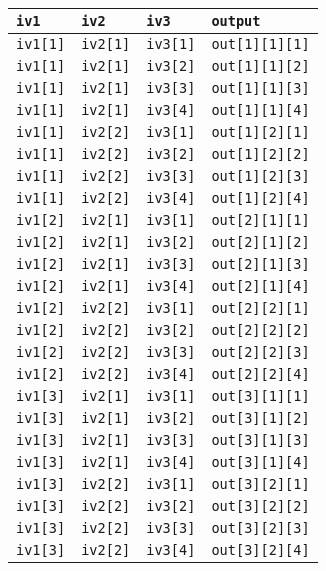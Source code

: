 \begin{longtable}[]{@{}llll@{}}
\toprule
\texttt{iv1} & \texttt{iv2} & \texttt{iv3} &
\texttt{output}\tabularnewline
\midrule
\endhead
\texttt{iv1{[}1{]}} & \texttt{iv2{[}1{]}} & \texttt{iv3{[}1{]}} &
\texttt{out{[}1{]}{[}1{]}{[}1{]}}\tabularnewline
\texttt{iv1{[}1{]}} & \texttt{iv2{[}1{]}} & \texttt{iv3{[}2{]}} &
\texttt{out{[}1{]}{[}1{]}{[}2{]}}\tabularnewline
\texttt{iv1{[}1{]}} & \texttt{iv2{[}1{]}} & \texttt{iv3{[}3{]}} &
\texttt{out{[}1{]}{[}1{]}{[}3{]}}\tabularnewline
\texttt{iv1{[}1{]}} & \texttt{iv2{[}1{]}} & \texttt{iv3{[}4{]}} &
\texttt{out{[}1{]}{[}1{]}{[}4{]}}\tabularnewline
\texttt{iv1{[}1{]}} & \texttt{iv2{[}2{]}} & \texttt{iv3{[}1{]}} &
\texttt{out{[}1{]}{[}2{]}{[}1{]}}\tabularnewline
\texttt{iv1{[}1{]}} & \texttt{iv2{[}2{]}} & \texttt{iv3{[}2{]}} &
\texttt{out{[}1{]}{[}2{]}{[}2{]}}\tabularnewline
\texttt{iv1{[}1{]}} & \texttt{iv2{[}2{]}} & \texttt{iv3{[}3{]}} &
\texttt{out{[}1{]}{[}2{]}{[}3{]}}\tabularnewline
\texttt{iv1{[}1{]}} & \texttt{iv2{[}2{]}} & \texttt{iv3{[}4{]}} &
\texttt{out{[}1{]}{[}2{]}{[}4{]}}\tabularnewline
\texttt{iv1{[}2{]}} & \texttt{iv2{[}1{]}} & \texttt{iv3{[}1{]}} &
\texttt{out{[}2{]}{[}1{]}{[}1{]}}\tabularnewline
\texttt{iv1{[}2{]}} & \texttt{iv2{[}1{]}} & \texttt{iv3{[}2{]}} &
\texttt{out{[}2{]}{[}1{]}{[}2{]}}\tabularnewline
\texttt{iv1{[}2{]}} & \texttt{iv2{[}1{]}} & \texttt{iv3{[}3{]}} &
\texttt{out{[}2{]}{[}1{]}{[}3{]}}\tabularnewline
\texttt{iv1{[}2{]}} & \texttt{iv2{[}1{]}} & \texttt{iv3{[}4{]}} &
\texttt{out{[}2{]}{[}1{]}{[}4{]}}\tabularnewline
\texttt{iv1{[}2{]}} & \texttt{iv2{[}2{]}} & \texttt{iv3{[}1{]}} &
\texttt{out{[}2{]}{[}2{]}{[}1{]}}\tabularnewline
\texttt{iv1{[}2{]}} & \texttt{iv2{[}2{]}} & \texttt{iv3{[}2{]}} &
\texttt{out{[}2{]}{[}2{]}{[}2{]}}\tabularnewline
\texttt{iv1{[}2{]}} & \texttt{iv2{[}2{]}} & \texttt{iv3{[}3{]}} &
\texttt{out{[}2{]}{[}2{]}{[}3{]}}\tabularnewline
\texttt{iv1{[}2{]}} & \texttt{iv2{[}2{]}} & \texttt{iv3{[}4{]}} &
\texttt{out{[}2{]}{[}2{]}{[}4{]}}\tabularnewline
\texttt{iv1{[}3{]}} & \texttt{iv2{[}1{]}} & \texttt{iv3{[}1{]}} &
\texttt{out{[}3{]}{[}1{]}{[}1{]}}\tabularnewline
\texttt{iv1{[}3{]}} & \texttt{iv2{[}1{]}} & \texttt{iv3{[}2{]}} &
\texttt{out{[}3{]}{[}1{]}{[}2{]}}\tabularnewline
\texttt{iv1{[}3{]}} & \texttt{iv2{[}1{]}} & \texttt{iv3{[}3{]}} &
\texttt{out{[}3{]}{[}1{]}{[}3{]}}\tabularnewline
\texttt{iv1{[}3{]}} & \texttt{iv2{[}1{]}} & \texttt{iv3{[}4{]}} &
\texttt{out{[}3{]}{[}1{]}{[}4{]}}\tabularnewline
\texttt{iv1{[}3{]}} & \texttt{iv2{[}2{]}} & \texttt{iv3{[}1{]}} &
\texttt{out{[}3{]}{[}2{]}{[}1{]}}\tabularnewline
\texttt{iv1{[}3{]}} & \texttt{iv2{[}2{]}} & \texttt{iv3{[}2{]}} &
\texttt{out{[}3{]}{[}2{]}{[}2{]}}\tabularnewline
\texttt{iv1{[}3{]}} & \texttt{iv2{[}2{]}} & \texttt{iv3{[}3{]}} &
\texttt{out{[}3{]}{[}2{]}{[}3{]}}\tabularnewline
\texttt{iv1{[}3{]}} & \texttt{iv2{[}2{]}} & \texttt{iv3{[}4{]}} &
\texttt{out{[}3{]}{[}2{]}{[}4{]}}\tabularnewline
\bottomrule
\end{longtable}

